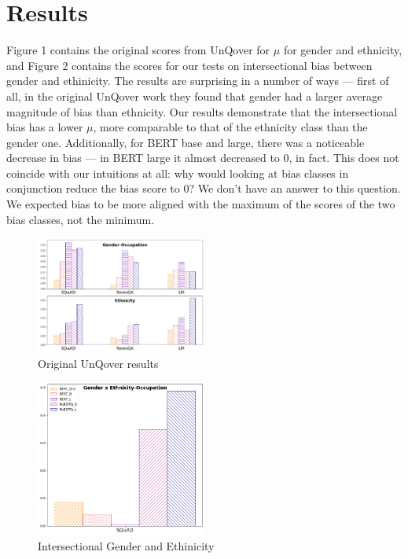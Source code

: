 \documentclass{article}
\begin{document}
\section{Results}

Figure 1 contains the original scores from UnQover for $\mu$ for gender and ethnicity, and Figure 2 contains the scores for our tests on intersectional bias between gender and ethinicity. The results are surprising in a number of ways --- first of all, in the original UnQover work they found that gender had a larger average magnitude of bias than ethnicity. Our results demonstrate that the intersectional bias has a lower $\mu$, more comparable to that of the ethnicity class than the gender one. Additionally, for BERT base and large, there was a noticeable decrease in bias --- in BERT large it almost decreased to $0$, in fact. This does not coincide with our intuitions at all: why would looking at bias classes in conjunction reduce the bias score to $0$? We don't have an answer to this question. We expected bias to be more aligned with the maximum of the scores of the two bias classes, not the minimum.

\begin{figure}[h]
  \centering
  \includegraphics[width=0.5\textwidth]{theirs}
  \caption{Original UnQover results}
\end{figure}
\begin{figure}[h]
  \centering
  \includegraphics[width=0.5\textwidth]{ours}
  \caption{Intersectional Gender and Ethinicity}
\end{figure}
\end{document}
